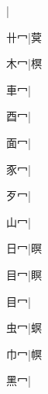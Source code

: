 \begin{multicols}{2}
{{}|{}\par
{\cjk{}{\cnsym{}　}卄{\cnxHanaA{}冖}}|{\cjk{}蓂}\par
{\cjk{}{\cnsym{}　}木{\cnxHanaA{}冖}}|{\cjk{}榠}\par
{\cjk{}{\cnsym{}　}車{\cnxHanaA{}冖}}|{}\par
{\cjk{}{\cnsym{}　}酉{\cnxHanaA{}冖}}|{}\par
{\cjk{}{\cnsym{}　}面{\cnxHanaA{}冖}}|{}\par
{\cjk{}{\cnsym{}　}豕{\cnxHanaA{}冖}}|{}\par
{\cjk{}{\cnsym{}　}歹{\cnxHanaA{}冖}}|{}\par
{\cjk{}{\cnsym{}　}山{\cnxHanaA{}冖}}|{}\par
{\cjk{}{\cnsym{}　}日{\cnxHanaA{}冖}}|{\cjk{}暝}\par
{\cjk{}{\cnsym{}　}目{\cnxHanaA{}冖}}|{\cjk{}瞑}\par
{目{\cnxHanaA{}冖}}|{}\par
{\cjk{}{\cnsym{}　}虫{\cnxHanaA{}冖}}|{\cjk{}螟}\par
{\cjk{}{\cnsym{}　}巾{\cnxHanaA{}冖}}|{\cjk{}幎}\par
{\cjk{}{\cnsym{}　}黑{\cnxHanaA{}冖}}|{}\par
}
\end{multicols}
